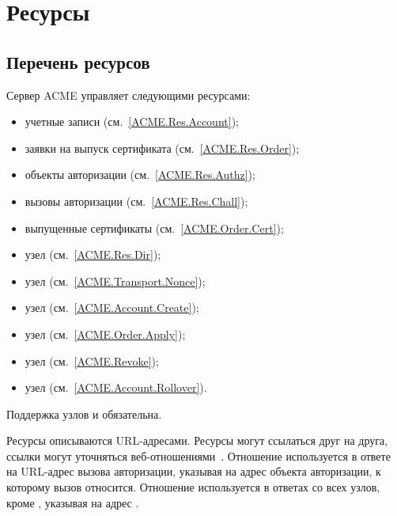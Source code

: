 \section{Ресурсы}\label{ACME.Res}

\subsection{Перечень ресурсов}\label{ACME.Res.List}

Сервер ACME управляет следующими ресурсами: 
\begin{itemize}
\item
учетные записи (см.~\ref{ACME.Res.Account});
\item
заявки на выпуск сертификата (см.~\ref{ACME.Res.Order});
\item
объекты авторизации (см.~\ref{ACME.Res.Authz});   
\item
вызовы авторизации (см.~\ref{ACME.Res.Chall});
\item
выпущенные сертификаты (см.~\ref{ACME.Order.Cert});
\item
узел  (см.~\ref{ACME.Res.Dir});
\item
узел  (см.~\ref{ACME.Transport.Nonce});
\item
узел  (см.~\ref{ACME.Account.Create});
\item
узел  (см.~\ref{ACME.Order.Apply});
\item
узел  (см.~\ref{ACME.Revoke});
\item
узел  (см.~\ref{ACME.Account.Rollover}).
\end{itemize}

Поддержка узлов  и  обязательна. 

Ресурсы описываются URL-адресами. Ресурсы могут ссылаться друг на друга, 
ссылки могут уточняться веб-отношениями~\cite{RFC8288}. 
%
Отношение  используется в ответе на URL-адрес вызова авторизации, 
указывая на адрес объекта авторизации, к которому вызов относится.
%
%
Отношение  используется в ответах со всех узлов, кроме , 
указывая на адрес .

